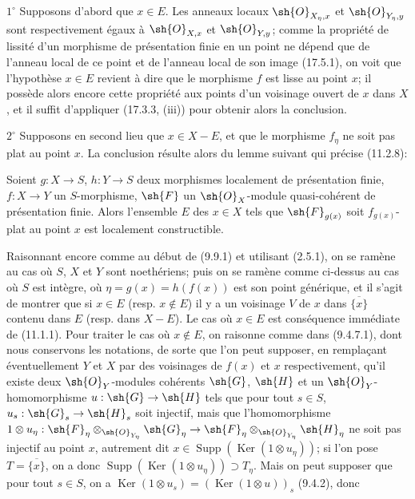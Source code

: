 $1^\circ$ Supposons d'abord que $x\in E$. Les anneaux locaux $\sh{O}_{X_\eta,x}$ et $\sh{O}_{Y_\eta,y}$ sont respectivement égaux à $\sh{O}_{X,x}$ et $\sh{O}_{Y,y}$; comme la propriété de lissité d'un morphisme de présentation finie en un point ne dépend que de l'anneau local de ce point et de l'anneau local de son image (17.5.1), on voit que l'hypothèse $x\in E$ revient à dire que le morphisme $f$ est lisse au point $x$; il possède alors encore cette propriété aux points d'un voisinage ouvert de $x$ dans $X$, et il suffit d'appliquer (17.3.3, (iii)) pour obtenir alors la conclusion.

$2^\circ$ Supposons en second lieu que $x\in X-E$, et que le morphisme $f_\eta$ ne soit pas plat au point $x$. La conclusion résulte alors du lemme suivant qui précise (11.2.8):

\begin{lemma}[17.7.11.1]
\label{IV.17.7.11.1}
Soient $g:X\to S$, $h:Y\to S$ deux morphismes localement de présentation finie, $f:X\to Y$ un $S$-morphisme, $\sh{F}$ un $\sh{O}_X$-module quasi-cohérent de présentation finie. Alors l'ensemble $E$ des $x\in X$ tels que $\sh{F}_{g(x)}$ soit $f_{g(x)}$-plat au point $x$ est localement constructible.
\end{lemma}

Raisonnant encore comme au début de (9.9.1) et utilisant (2.5.1), on se ramène au cas où $S$, $X$ et $Y$ sont noethériens; puis on se ramène comme ci-dessus au cas où $S$ est intègre, où $\eta=g(x)=h(f(x))$ est son point générique, et il s'agit de montrer que si $x\in E$ (resp. $x\notin E$) il y a un voisinage $V$ de $x$ dans $\overline{\{x\}}$ contenu dans $E$ (resp. dans $X-E$). Le cas où $x\in E$ est conséquence immédiate de (11.1.1). Pour traiter le cas où $x\notin E$, on raisonne comme dans (9.4.7.1), dont nous conservons les notations, de sorte que l'on peut supposer, en remplaçant éventuellement $Y$ et $X$ par des voisinages de $f(x)$ et $x$ respectivement, qu'il existe deux $\sh{O}_Y$-modules cohérents $\sh{G}$, $\sh{H}$ et un $\sh{O}_Y$-homomorphisme $u:\sh{G}\to\sh{H}$ tels que pour tout $s\in S$, $u_s:\sh{G}_s\to\sh{H}_s$ soit injectif, mais que l'homomorphisme $1\otimes u_\eta:\sh{F}_\eta\otimes_{\sh{O}_{Y_\eta}}\sh{G}_\eta\to\sh{F}_\eta\otimes_{\sh{O}_{Y_\eta}}\sh{H}_\eta$ ne soit pas injectif au point $x$, autrement dit $x\in\operatorname{Supp}(\operatorname{Ker}(1\otimes u_\eta))$; si l'on pose $T=\overline{\{x\}}$, on a donc $\operatorname{Supp}(\operatorname{Ker}(1\otimes u_\eta))\supset T_\eta$. Mais on peut supposer que pour tout $s\in S$, on a $\operatorname{Ker}(1\otimes u_s)=(\operatorname{Ker}(1\otimes u))_s$ (9.4.2), donc

